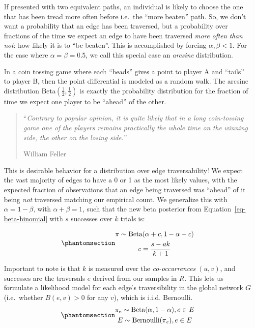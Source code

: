 \documentclass[%
	12pt,
		oneside,
		letterpaper
]{book}
\begin{document}
If presented with two equivalent paths, an individual is likely to
choose the one that has been tread more often before i.e.~the ``more
beaten'' path. So, we don't want a probability that an edge has been
traversed, but a probability over fractions of the time we expect an
edge to have been traversed \emph{more often than not}: how likely it is
to ``be beaten''. This is accomplished by forcing \(\alpha, \beta < 1\).
For the case where \(\alpha=\beta=0.5\), we call this special case an
\emph{arcsine} distribution.

In a coin tossing game where each ``heads'' gives a point to player A
and ``tails'' to player B, then the point differential is modeled as a
random walk. The arcsine distribution
\(\text{Beta}(\tfrac{1}{2},\tfrac{1}{2})\) is exactly the probability
distribution for the fraction of time we expect one player to be
``ahead'' of the other. \autocite{WhatisArcsine_Ackelsberg2018}

\begin{quote}
``\emph{Contrary to popular opinion, it is quite likely that in a long
coin-tossing game one of the players remains practically the whole time
on the winning side, the other on the losing side.''}

William Feller\autocite[Chapter
III]{IntroductionProbabilityTheory_Feller1968}
\end{quote}

This is desirable behavior for a distribution over edge traversability!
We expect the vast majority of edges to have a 0 or 1 as the most likely
values, with the expected fraction of observations that an edge being
traversed was ``ahead'' of it being \emph{not} traversed matching our
empirical count. We generalize this with \(\alpha = 1-\beta\), with
\(\alpha + \beta = 1\), such that the new beta posterior from
Equation~\ref{eq-beta-binomial} with \(s\) successes over \(k\) trials
is:

\begin{equation}\phantomsection\label{eq-desirepath-binom}{
\begin{gathered}
\pi \sim \text{Beta}(\alpha + c, 1-\alpha-c) \\
c = \frac{s-ak}{k+1}\\
\end{gathered}
}\end{equation}

Important to note is that \(k\) is measured over the
\emph{co-occurrences} \((u,v)\), and successes are the traversals \(e\)
derived from our samples in \(R\). This lets us formulate a likelihood
model for each edge's traversibility in the global network \(G\)
(i.e.~whether \(B(e,v)>0\) for any \(v\)), which is i.i.d. Bernoulli.
\begin{equation}\phantomsection\label{eq-empirical-model}{
\begin{gathered}
\pi_e \sim \text{Beta}(\alpha, 1-\alpha), e\in E\\ 
E \sim \text{Bernoulli}(\pi_e), e \in E
\end{gathered}
}\end{equation}
\end{document}
